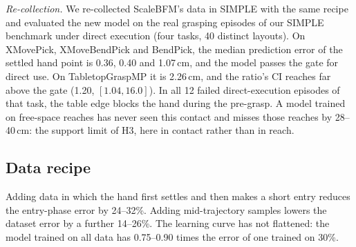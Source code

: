 \documentclass[conference]{IEEEtran}
\begin{document}
\emph{Re-collection.} We re-collected ScaleBFM's data in SIMPLE with the same recipe and evaluated the new model on the real grasping episodes of our SIMPLE benchmark under direct execution (four tasks, 40 distinct layouts). On XMovePick, XMoveBendPick and BendPick, the median prediction error of the settled hand point is 0.36, 0.40 and 1.07\,cm, and the model passes the gate for direct use. On TabletopGraspMP it is 2.26\,cm, and the ratio's CI reaches far above the gate (1.20, $[1.04,16.0]$). In all 12 failed direct-execution episodes of that task, the table edge blocks the hand during the pre-grasp. A model trained on free-space reaches has never seen this contact and misses those reaches by 28--40\,cm: the support limit of H3, here in contact rather than in reach.

\subsection{Data recipe}
Adding data in which the hand first settles and then makes a short entry reduces the entry-phase error by 24--32\%. Adding mid-trajectory samples lowers the dataset error by a further 14--26\%. The learning curve has not flattened: the model trained on all data has 0.75--0.90 times the error of one trained on 30\%.
\end{document}
